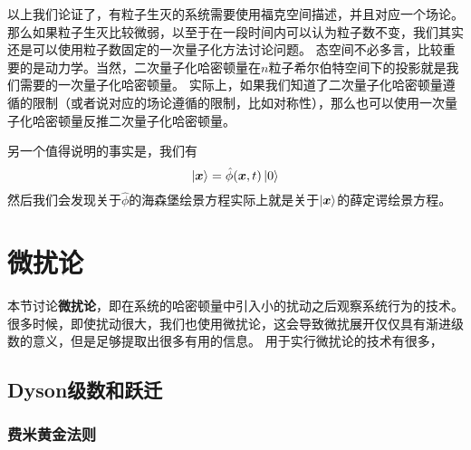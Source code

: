 \documentclass[UTF8, a4paper]{ctexart}
\begin{document}
以上我们论证了，有粒子生灭的系统需要使用福克空间描述，并且对应一个场论。
那么如果粒子生灭比较微弱，以至于在一段时间内可以认为粒子数不变，我们其实还是可以使用粒子数固定的一次量子化方法讨论问题。
态空间不必多言，比较重要的是动力学。当然，二次量子化哈密顿量在$n$粒子希尔伯特空间下的投影就是我们需要的一次量子化哈密顿量。
实际上，如果我们知道了二次量子化哈密顿量遵循的限制（或者说对应的场论遵循的限制，比如对称性），那么也可以使用一次量子化哈密顿量反推二次量子化哈密顿量。

另一个值得说明的事实是，我们有
\[
    \ket{\vb*{x}} = \hat{\phi}(\vb*{x}, t) \ket{0}
\]
然后我们会发现关于$\hat{\phi}$的海森堡绘景方程实际上就是关于$\ket{\vb*{x}}$的薛定谔绘景方程。


\section{微扰论}

本节讨论\textbf{微扰论}，即在系统的哈密顿量中引入小的扰动之后观察系统行为的技术。
很多时候，即使扰动很大，我们也使用微扰论，这会导致微扰展开仅仅具有渐进级数的意义，但是足够提取出很多有用的信息。
用于实行微扰论的技术有很多，%

\subsection{Dyson级数和跃迁}

\subsubsection{费米黄金法则}
\end{document}
